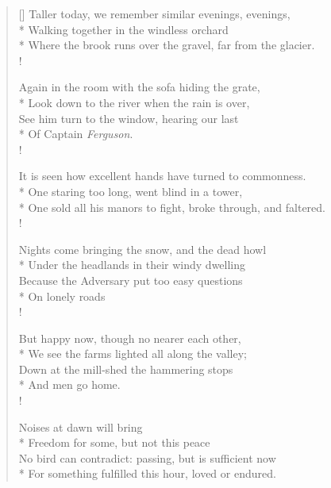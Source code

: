 \documentclass[MAIN]{subfiles}
\begin{document}
\settowidth{\versewidth}{Taller today, we remember similar evenings,}
\begin{verse}[\versewidth]
Taller today, we remember similar evenings, evenings,\\*
Walking together in the windless orchard\\*
Where the brook runs over the gravel, far from the glacier.\\!

Again in the room with the sofa hiding the grate,\\*
Look down to the river when the rain is over,\\
See him turn to the window, hearing our last\\*
Of Captain \emph{Ferguson}.\\!

It is seen how excellent hands have turned to commonness.\\*
One staring too long, went blind in a tower,\\*
One sold all his manors to fight, broke through, and faltered.\\!

Nights come bringing the snow, and the dead howl\\*
Under the headlands in their windy dwelling\\
Because the Adversary put too easy questions\\*
On lonely roads\\!

But happy now, though no nearer each other,\\*
We see the farms lighted all along the valley;\\
Down at the mill-shed the hammering stops\\*
And men go home.\\!

Noises at dawn will bring\\*
Freedom for some, but not this peace\\
No bird can contradict: passing, but is sufficient now\\*
For something fulfilled this hour, loved or endured.
\end{verse}
\end{document}
